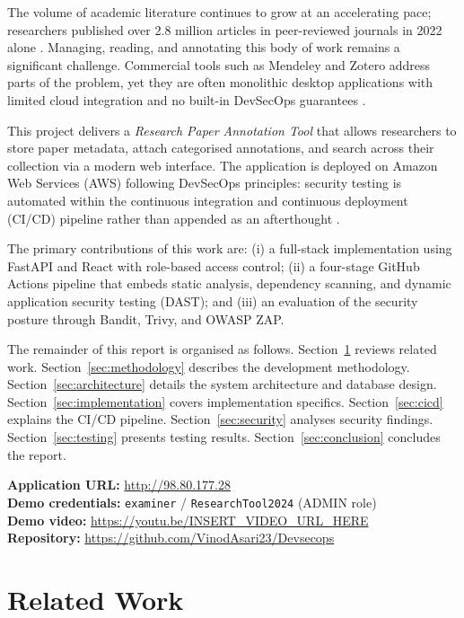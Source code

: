\documentclass[conference]{IEEEtran}
\begin{document}
The volume of academic literature continues to grow at an accelerating pace; researchers published over 2.8 million articles in peer-reviewed journals in 2022 alone \cite{johnson2023scholarly}. Managing, reading, and annotating this body of work remains a significant challenge. Commercial tools such as Mendeley and Zotero address parts of the problem, yet they are often monolithic desktop applications with limited cloud integration and no built-in DevSecOps guarantees \cite{ivey2018mendeley}.

This project delivers a \textit{Research Paper Annotation Tool} that allows researchers to store paper metadata, attach categorised annotations, and search across their collection via a modern web interface. The application is deployed on Amazon Web Services (AWS) following DevSecOps principles: security testing is automated within the continuous integration and continuous deployment (CI/CD) pipeline rather than appended as an afterthought \cite{myrbakken2017devsecops}.

The primary contributions of this work are: (i) a full-stack implementation using FastAPI and React with role-based access control; (ii) a four-stage GitHub Actions pipeline that embeds static analysis, dependency scanning, and dynamic application security testing (DAST); and (iii) an evaluation of the security posture through Bandit, Trivy, and OWASP ZAP.

The remainder of this report is organised as follows. Section~\ref{sec:related} reviews related work. Section~\ref{sec:methodology} describes the development methodology. Section~\ref{sec:architecture} details the system architecture and database design. Section~\ref{sec:implementation} covers implementation specifics. Section~\ref{sec:cicd} explains the CI/CD pipeline. Section~\ref{sec:security} analyses security findings. Section~\ref{sec:testing} presents testing results. Section~\ref{sec:conclusion} concludes the report.

\smallskip
\noindent\textbf{Application URL:} \url{http://98.80.177.28}\\
\textbf{Demo credentials:} \texttt{examiner} / \texttt{ResearchTool2024} (ADMIN role)\\
\textbf{Demo video:} \url{https://youtu.be/INSERT_VIDEO_URL_HERE}\\
\textbf{Repository:} \url{https://github.com/VinodAsari23/Devsecops}

\section{Related Work}
\label{sec:related}
\end{document}
